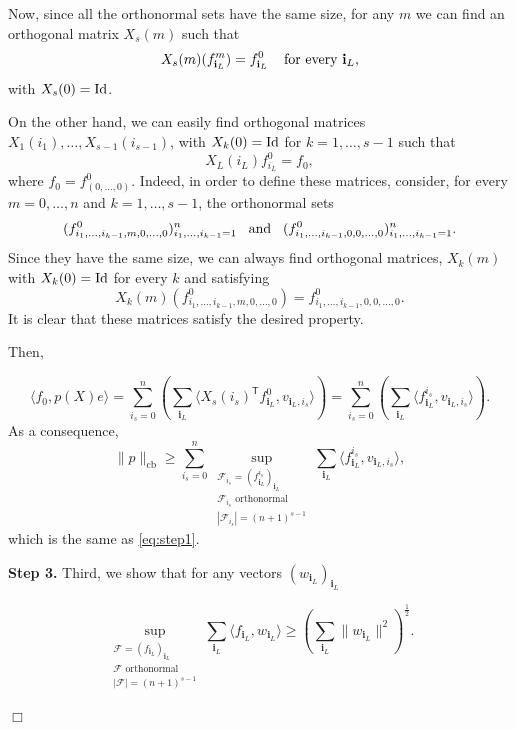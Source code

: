 \documentclass[11pt]{article}
\DeclareMathOperator{\cb}{cb}
\newcommand{\norm}[1]{\|#1\|}
\newcommand{\1}{\mathbf{1}}
\newcommand{\Id}{\ensuremath{\mathop{\rm Id}\nolimits}}
\newcommand{\ind}[1]{\mathbf{#1}}
\theoremstyle{plain}
\theoremstyle{definition}
\theoremstyle{remark}
\renewenvironment{proof}[1][]{
    	\begin{trivlist}
     	\item[\hspace{\labelsep}{\em\noindent Proof#1:\/}]}
     	{{\hfill$\Box$}
    	\end{trivlist}
  }
\begin{document}
\begin{proof}
Now, since all the orthonormal sets have the same size, for any $m$ we can find an orthogonal matrix $X_s(m)$ such that $$X_s(m)(f^m_{\ind{i}_L})=f^0_{\ind{i}_L}\hspace{0.4 cm}\text{for every $\ind{i}_L$},$$ with  $X_s(0)=\Id$. 



On the other hand, we can easily find orthogonal matrices $X_1(i_1),\ldots, X_{s-1}(i_{s-1})$, with $X_k(0)=\Id$ for $k=1,\ldots, s-1$ such that $$X_L ({i}_L)f^0_{{i}_L}=f_{0},$$ where $f_{0}=f^0_{(0,\dots,0)}$.  Indeed, in order to define these matrices, consider, for every $m=0,\ldots, n$ and $k=1,\ldots, s-1$, the orthonormal sets $$(f^0_{i_1,\ldots , i_{k-1}, m,0,\ldots, 0})_{i_1,\ldots, i_{k-1}=1}^n\hspace{0.3 cm} \text{and}\hspace{0.3 cm}(f^0_{i_1,\ldots , i_{k-1}, 0,0,\ldots, 0})_{i_1,\ldots, i_{k-1}=1}^n.$$ Since they have the same size, we can always find orthogonal matrices, $X_k(m)$ with $X_k(0)=\Id$ for every $k$ and satisfying $$X_k(m)(f^0_{i_1,\ldots , i_{k-1}, m,0,\ldots, 0})=f^0_{i_1,\ldots , i_{k-1}, 0,0,\ldots, 0}.$$ It is clear that these matrices satisfy the desired property.



    Then,

    $$\langle f_{0}, p(X) e\rangle =\sum_{i_s=0}^ n \left( \sum_{{\ind{i}_L}} \langle X_s(i_s) ^{\mathsf T} f^0_{{\ind{i}_L}},   v_{{\ind{i}_L},i_s}\rangle\right)=\sum_{i_s=0}^ n \left( \sum_{{\ind{i}_L}} \langle  f^{i_s}_{{\ind{i}_L}},   v_{{\ind{i}_L},i_s}\rangle\right).$$ 
    As a consequence,
 $$\norm{p}_{\cb}\geq \sum_{i_s=0}^n \sup _{\substack{\mathcal{F}_{i_s}=(f^{i_s}_{{\ind{i}_L}})_{{\ind{i}_L}}\\
  \mathcal{F}_{i_s}\text{ orthonormal}\\|\mathcal{F}_{i_s}|=(n+1)^{s-1}}} \sum_{{\ind{i}_L}} \langle f^{i_s}_{{\ind{i}_L}}, v_{{\ind{i}_L},i_s}\rangle,$$ which is the same as \eqref{eq:step1}.

   

 {\bf Step 3.} Third, we show that for any vectors $(w_{{\ind{i}_L}})_{{\ind{i}_L}}$

\begin{equation}
    \label{eq:step2}
 \sup _{\substack{\mathcal{F}=(f_{{\ind{i}_L}})_{{\ind{i}_L}}\\
\mathcal{F}\text{ orthonormal}\\|\mathcal{F}|=(n+1)^{s-1}}} \sum_{{\ind{i}_L}} \langle f_{{\ind{i}_L}}, w_{{\ind{i}_L}}\rangle \geq \left(\sum_{{\ind{i}_L}} \|w_{{\ind{i}_L}}\|^2\right)^\frac12.\end{equation}



\end{proof}
\end{document}
